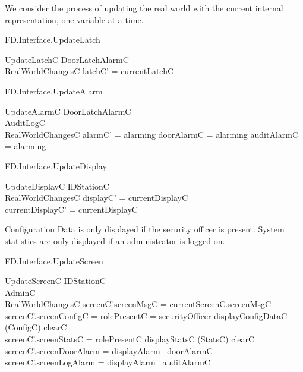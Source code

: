 We consider the process of updating the real world with the current
internal 
representation, one variable at a time.

\begin{traceunit}{FD.Interface.UpdateLatch}
\end{traceunit}

\begin{schema}{UpdateLatchC}
	\Xi DoorLatchAlarmC
\\	RealWorldChangesC
\where
	latchC' = currentLatchC
\end{schema}

\begin{traceunit}{FD.Interface.UpdateAlarm}
\end{traceunit}

\begin{schema}{UpdateAlarmC}
	\Xi DoorLatchAlarmC
\\      AuditLogC
\\	RealWorldChangesC
\where
        alarmC' = alarming \iff doorAlarmC = alarming \lor auditAlarmC = alarming 
\end{schema}

\begin{traceunit}{FD.Interface.UpdateDisplay}
\end{traceunit}

\begin{schema}{UpdateDisplayC}
	\Delta IDStationC
\\	RealWorldChangesC
\where
	displayC' = currentDisplayC
\\
        currentDisplayC' = currentDisplayC
\end{schema}

Configuration Data is only displayed if the security officer is
present. System statistics are only displayed if an administrator is
logged on.


\begin{traceunit}{FD.Interface.UpdateScreen}
\end{traceunit}

\begin{schema}{UpdateScreenC}
        \Xi IDStationC
\\      \Xi AdminC
\\      RealWorldChangesC
\where
           screenC'.screenMsgC = currentScreenC.screenMsgC
\\           screenC'.screenConfigC = \IF \The rolePresentC =
securityOfficer \THEN displayConfigDataC (\theta ConfigC) \ELSE clearC 
\\            screenC'.screenStatsC = \IF rolePresentC \neq \Nil
\THEN displayStatsC (\theta StatsC) \ELSE clearC
\\     screenC'.screenDoorAlarm = displayAlarm~ doorAlarmC
\\     screenC'.screenLogAlarm = displayAlarm~ auditAlarmC
\end{schema}
 
